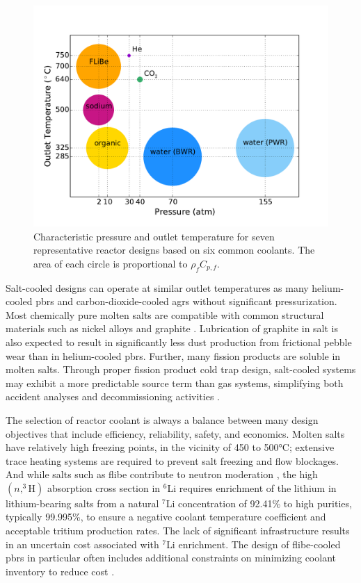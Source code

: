 \begin{figure}[h!]
\centering
\includegraphics[width=0.6\linewidth]{figs/fluid_T_p.pdf}
\caption{Characteristic pressure and outlet temperature for seven representative reactor designs based on six common coolants. The area of each circle is proportional to \(\rho_fC_{p,f}\).}
\label{fig:fluid_T_p}
\end{figure}

Salt-cooled designs can operate at similar outlet temperatures as many helium-cooled \glspl{pbr} and carbon-dioxide-cooled \glspl{agr} without significant pressurization. Most chemically pure molten salts are compatible with common structural materials such as nickel alloys and graphite \cite{fratoni}. Lubrication of graphite in salt is also expected to result in significantly less dust production from frictional pebble wear than in helium-cooled \glspl{pbr}. Further, many fission products are soluble in molten salts. Through proper fission product cold trap design, salt-cooled systems may exhibit a more predictable source term than gas systems, simplifying both accident analyses and decommissioning activities \cite{moormann}.

The selection of reactor coolant is always a balance between many design objectives that include efficiency, reliability, safety, and economics. Molten salts have relatively high freezing points, in the vicinity of 450 to 500\si{\celsius}; extensive trace heating systems are required to prevent salt freezing and flow blockages. And while salts such as \gls{flibe} contribute to neutron moderation \cite{fratoni}, the high \((n,^3\text{H})\) absorption cross section in $^6$Li requires enrichment of the lithium in lithium-bearing salts from a natural $^7$Li concentration of 92.41\% to high purities, typically 99.995\%, to ensure a negative coolant temperature coefficient and acceptable tritium production rates. The lack of significant infrastructure results in an uncertain cost associated with $^7$Li enrichment. The design of \gls{flibe}-cooled \glspl{pbr} in particular often includes additional constraints on minimizing coolant inventory to reduce cost \cite{pbfhr}.

